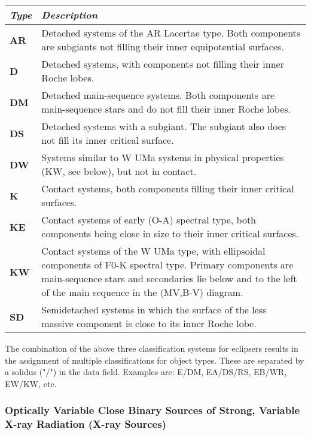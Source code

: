 \begin{longtabu} to \textwidth {l|X}
\toprule
\emph{Type} & \emph{Description}\tabularnewline
\midrule
\textbf{AR} & Detached systems of the AR Lacertae type. Both components
are subgiants not filling their inner equipotential
surfaces.\tabularnewline
\midrule
\textbf{D} & Detached systems, with components not filling their inner
Roche lobes.\tabularnewline
\midrule
\textbf{DM} & Detached main-sequence systems. Both components are
main-sequence stars and do not fill their inner Roche
lobes.\tabularnewline
\midrule
\textbf{DS} & Detached systems with a subgiant. The subgiant also does
not fill its inner critical surface.\tabularnewline
\midrule
\textbf{DW} & Systems similar to W UMa systems in physical properties
(KW, see below), but not in contact.\tabularnewline
\midrule
\textbf{K} & Contact systems, both components filling their inner
critical surfaces.\tabularnewline
\midrule
\textbf{KE} & Contact systems of early (O-A) spectral type, both
components being close in size to their inner critical
surfaces.\tabularnewline
\midrule
\textbf{KW} & Contact systems of the W UMa type, with ellipsoidal
components of F0-K spectral type. Primary components are main-sequence
stars and secondaries lie below and to the left of the main sequence in
the (MV,B-V) diagram.\tabularnewline
\midrule
\textbf{SD} & Semidetached systems in which the surface of the less
massive component is close to its inner Roche lobe.\tabularnewline
\bottomrule
\end{longtabu}

The combination of the above three classification systems for eclipsers
results in the assignment of multiple classifications for object types.
These are separated by a solidus ("/") in the data field. Examples are:
E/DM, EA/DS/RS, EB/WR, EW/KW, etc.

\subsubsection{Optically Variable Close Binary Sources of Strong, Variable
X-ray Radiation (X-ray
Sources)}\label{optically-variable-close-binary-sources-of-strong-variable-x-ray-radiation-x-ray-sources}

